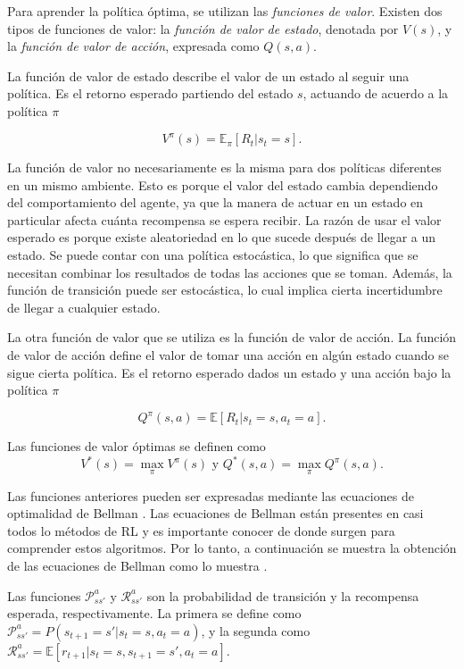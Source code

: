 Para aprender la política óptima, se utilizan las \textit{funciones de valor}. Existen dos tipos de funciones de valor: la \textit{ función de valor de estado},
denotada por $V(s)$, y la \textit{función de valor de acción}, expresada como $Q(s, a)$.

La función de valor de estado describe el valor de un estado al seguir una política. Es el retorno esperado partiendo del estado $s$, actuando de acuerdo
a la política $\pi$

\begin{equation}\label{eq:state-value-func}
V^\pi(s) = \mathbb{E}_\pi[R_t | s_t = s].    
\end{equation}


La función de valor no necesariamente es la misma para dos políticas diferentes
en un mismo ambiente. Esto es porque el valor del estado
cambia dependiendo del comportamiento del agente, ya que la manera de actuar
en un estado en particular afecta cuánta recompensa se espera recibir.
La razón de usar el valor esperado  es porque existe aleatoriedad en lo que
sucede después de llegar a un estado. Se puede contar con una política estocástica, lo que significa que se necesitan combinar los resultados de 
todas las acciones que se toman. Además, la función de transición puede ser estocástica, lo cual implica cierta incertidumbre de llegar a cualquier 
estado.

La otra función de valor que se utiliza es la función de valor de acción.
La función de valor de acción define el valor de 
tomar una acción en algún estado cuando se sigue cierta política. Es el
retorno esperado dados un estado y una acción bajo la política $\pi$

\begin{equation}\label{eq:action-value-func}
Q^\pi (s,a) = \mathbb{E}[R_t | s_t = s, a_t = a].    
\end{equation}

Las funciones de valor óptimas se definen como
\[
V^*(s) = \max_{\pi} V^\pi(s) \text{ y } Q^*(s, a) = \max_{\pi} Q^\pi (s,a).
\]


Las funciones anteriores pueden ser expresadas mediante las ecuaciones de optimalidad de Bellman \cite{bellman1966dynamic}.
Las ecuaciones de Bellman están presentes en casi todos lo métodos de RL y es importante conocer de donde surgen para comprender estos algoritmos. Por lo tanto, a continuación se muestra la obtención de las ecuaciones
de Bellman como lo muestra \cite{greaves}.

Las funciones $\mathcal{P}_{ss'}^a$ y $\mathcal{R}_{ss'}^a$ son la probabilidad de transición y la recompensa esperada, respectivamente. La primera se define como
$\mathcal{P}_{ss'}^a = P(s_{t+1} = s' | s_t = s, a_t = a)$,
y la segunda como
$\mathcal{R}_{ss'}^a = \mathbb{E}[r_{t+1} | s_t = s, s_{t+1} = s', a_t = a]$.

